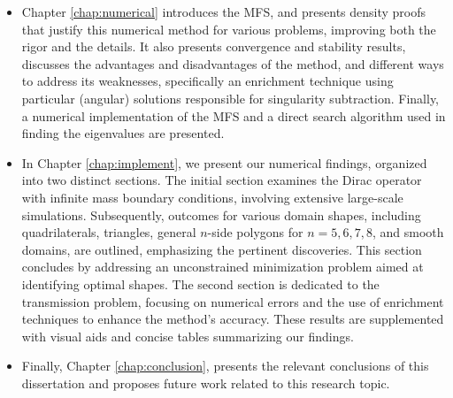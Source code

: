 \begin{itemize}
\item Chapter \ref{chap:numerical} introduces the \ac*{MFS}, and presents density proofs that justify this numerical method for various problems, improving both the rigor and the details. It also presents convergence and stability results, discusses the advantages and disadvantages of the method, and different ways to address its weaknesses, specifically an enrichment technique using particular (angular) solutions responsible for singularity subtraction. Finally, a numerical implementation of the \ac{MFS} and a direct search algorithm used in finding the eigenvalues are presented.
\item In Chapter \ref{chap:implement}, we present our numerical findings, organized into two distinct sections. The initial section examines the Dirac operator with infinite mass boundary conditions, involving extensive large-scale simulations. Subsequently, outcomes for various domain shapes, including quadrilaterals, triangles, general \(n\)-side polygons for \(n=5,6,7,8\), and smooth domains, are outlined, emphasizing the pertinent discoveries. This section concludes by addressing an unconstrained minimization problem aimed at identifying optimal shapes. The second section is dedicated to the transmission problem, focusing on numerical errors and the use of enrichment techniques to enhance the method's accuracy. These results are supplemented with visual aids and concise tables summarizing our findings.
\item Finally, Chapter \ref{chap:conclusion}, presents the relevant conclusions of this dissertation and proposes future work related to this research topic.
\end{itemize}



